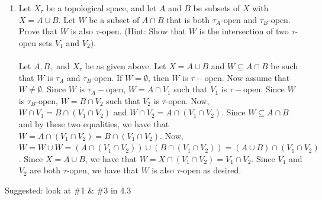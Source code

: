 \documentclass[12pt]{article}
\begin{document}
\begin{enumerate}
\item  Let $X_{\tau}$ be a topological space, and let $A$ and $B$ be subsets of $X$ with $X=A\cup B$. Let $W$ be a subset of $A\cap B$ that is both $\tau_A$-open and $\tau_B$-open. Prove that $W$ is also $\tau$-open. (Hint: Show that $W$ is the intersection of two $\tau$-open sets $V_1$ and $V_2$).\\\\
Let $A, B,$ and $X_{\tau}$ be as given above. Let $X=A\cup B$ and $W\subseteq A\cap B$ be such that $W$ is $\tau_A$ and $\tau_B$-open. If $W=\emptyset$, then $W$ is $\tau-$open. Now assume that $W\neq\emptyset$. Since $W$ is $\tau_A-$open, $W=A\cap V_1$ such that $V_1$ is $\tau-$open. Since $W$ is $\tau_B$-open, $W=B\cap V_2$ such that $V_2$ is $\tau$-open. Now, $W\cap V_1=B\cap(V_1\cap V_2)$ and $W\cap V_2=A\cap(V_1\cap V_2)$. Since $W\subseteq A\cap B$ and by these two equalities, we have that $W=A\cap(V_1\cap V_2)=B\cap(V_1\cap V_2)$. Now, $W=W\cup W=(A\cap(V_1\cap V_2))\cup (B\cap(V_1\cap V_2))=(A\cup B)\cap(V_1\cap V_2)$. Since $X=A\cup B$, we have that $W=X\cap(V_1\cap V_2)=V_1\cap V_2$. Since $V_1$ and $V_2$ are both $\tau$-open, we have that $W$ is also $\tau$-open as desired.

\end{enumerate}


\vspace{.2in}
\noindent Suggested: look at \#1 \& \#3 in 4.3 
\end{document}
